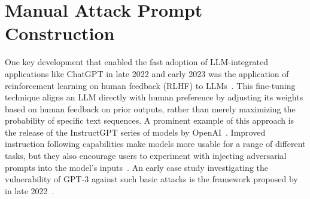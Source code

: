 \section{Manual Attack Prompt Construction} \label{sec:manual_prompts}
One key development that enabled the fast adoption of LLM-integrated applications like ChatGPT in late 2022 and early 2023 was the application of reinforcement learning on human feedback (RLHF) to LLMs~\cite{chaudhari_rlhf_2025}.
This fine-tuning technique aligns an LLM directly with human preference by adjusting its weights based on human feedback on prior outputs, rather than merely maximizing the probability of specific text sequences.
A prominent example of this approach is the release of the InstructGPT series of models by OpenAI~\cite{ouyang_training_2022}.
Improved instruction following capabilities make models more usable for a range of different tasks, but they also encourage users to experiment with injecting adversarial prompts into the model's inputs~\cite{willison_prompt_nodate, preamble_discovery_nodate}.
An early case study investigating the vulnerability of GPT-3 against such basic attacks is the framework proposed by \perez in late 2022~\cite{perez_ignore_2022}.\\

